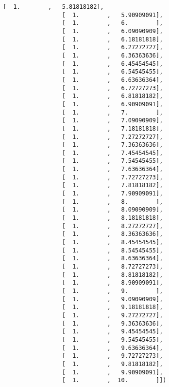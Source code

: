 \documentclass[11pt]{article}
\begin{document}
\begin{Verbatim}[commandchars=\\\{\}]
                 [  1.        ,   5.81818182],
                 [  1.        ,   5.90909091],
                 [  1.        ,   6.        ],
                 [  1.        ,   6.09090909],
                 [  1.        ,   6.18181818],
                 [  1.        ,   6.27272727],
                 [  1.        ,   6.36363636],
                 [  1.        ,   6.45454545],
                 [  1.        ,   6.54545455],
                 [  1.        ,   6.63636364],
                 [  1.        ,   6.72727273],
                 [  1.        ,   6.81818182],
                 [  1.        ,   6.90909091],
                 [  1.        ,   7.        ],
                 [  1.        ,   7.09090909],
                 [  1.        ,   7.18181818],
                 [  1.        ,   7.27272727],
                 [  1.        ,   7.36363636],
                 [  1.        ,   7.45454545],
                 [  1.        ,   7.54545455],
                 [  1.        ,   7.63636364],
                 [  1.        ,   7.72727273],
                 [  1.        ,   7.81818182],
                 [  1.        ,   7.90909091],
                 [  1.        ,   8.        ],
                 [  1.        ,   8.09090909],
                 [  1.        ,   8.18181818],
                 [  1.        ,   8.27272727],
                 [  1.        ,   8.36363636],
                 [  1.        ,   8.45454545],
                 [  1.        ,   8.54545455],
                 [  1.        ,   8.63636364],
                 [  1.        ,   8.72727273],
                 [  1.        ,   8.81818182],
                 [  1.        ,   8.90909091],
                 [  1.        ,   9.        ],
                 [  1.        ,   9.09090909],
                 [  1.        ,   9.18181818],
                 [  1.        ,   9.27272727],
                 [  1.        ,   9.36363636],
                 [  1.        ,   9.45454545],
                 [  1.        ,   9.54545455],
                 [  1.        ,   9.63636364],
                 [  1.        ,   9.72727273],
                 [  1.        ,   9.81818182],
                 [  1.        ,   9.90909091],
                 [  1.        ,  10.        ]])
\end{Verbatim}
            

    
    
    
    
\end{document}
